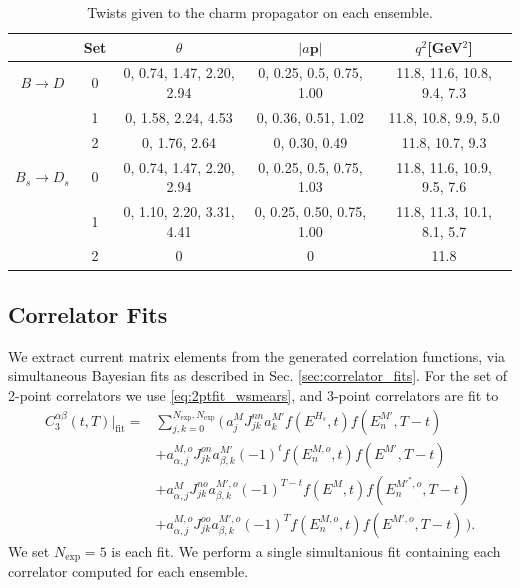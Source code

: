 \begin{table}[htb!]
  \vspace{10pt}
  \hspace{-15pt}
 \begin{tabular}{c c c c c}
 \hline
 & Set & $\theta$ & $|a{\textbf{p}}|$ & $q^2$[GeV$^2$] \\ [0.5ex] 
 \hline
 $B\to D$ & 0 & 0, 0.74, 1.47, 2.20, 2.94 & 0, 0.25, 0.5, 0.75, 1.00 & 11.8, 11.6, 10.8, 9.4, 7.3 \\ [1ex]
 & 1 & 0, 1.58, 2.24, 4.53 & 0, 0.36, 0.51, 1.02 & 11.8, 10.8, 9.9, 5.0  \\ [1ex]
 & 2 & 0, 1.76, 2.64 & 0, 0.30, 0.49 & 11.8, 10.7, 9.3 \\ [1ex]
 \hline
 $B_s\to D_s$ & 0 & 0, 0.74, 1.47, 2.20, 2.94 & 0, 0.25, 0.5, 0.75, 1.03 & 11.8, 11.6, 10.9, 9.5, 7.6 \\ [1ex]
 & 1 & 0, 1.10, 2.20, 3.31, 4.41 & 0, 0.25, 0.50, 0.75, 1.00 & 11.8, 11.3, 10.1, 8.1, 5.7 \\ [1ex]
 & 2 & 0 & 0 & 11.8\\  [1ex]
 \hline
\end{tabular}
 \caption{Twists given to the charm propagator on each ensemble. \label{tab:nrqcd_twists} }
\end{table}

\subsection{Correlator Fits}

We extract current matrix elements from the generated correlation functions, via simultaneous Bayesian fits as described in Sec. \ref{sec:correlator_fits}. For the set of 2-point correlators we use \eqref{eq:2ptfit_wsmears}, and 3-point correlators are fit to
\begin{align}
  \nonumber
  C^{\alpha\beta}_{3}(t,T)|_{\text{fit}} =& \sum_{j,k=0}^{N_{\text{exp}},N_{\text{exp}}} \Big(\, a^{M}_j J^{nn}_{jk} a^{M'}_k f(E^{H_s},t) f(E^{M'}_n,T-t)
  \\ \nonumber
  &+a^{M,o}_{\alpha,j} J^{on}_{jk} a_{\beta,k}^{M'} (-1)^t f(E^{M,o}_n,t) f(E^{M'},T-t)
  \\ \nonumber
  &+a_{\alpha,j}^{M} J^{no}_{jk} a_{\beta,k}^{M',o} (-1)^{T-t} f(E^{M},t) f(E^{M'^*,o}_n,T-t)
  \\
  &+a_{\alpha,j}^{M,o} J^{oo}_{jk} a_{\beta,k}^{M',o} (-1)^T f(E^{M,o}_n,t) f(E^{M',o},T-t) \,\Big).
  \label{eq:3ptcorrelator_real}
\end{align}
We set $N_{\text{exp}}=5$ is each fit. We perform a single simultanious fit containing each correlator computed for each ensemble.

